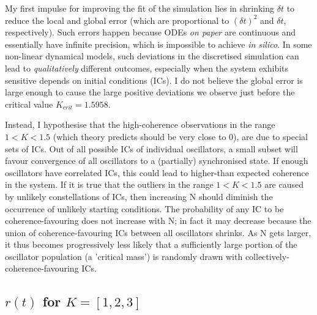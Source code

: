 \documentclass[11pt,a4paper]{article}
\begin{document}
My first impulse for improving the fit of the simulation lies in shrinking $\delta t$ to reduce the local and global error (which are proportional to $(\delta t)^2$ and $\delta t$, respectively).
Such errors happen because ODEs \textit{on paper} are continuous and essentially have infinite precision, which is impossible to achieve \textit{in silico}. 
In some non-linear dynamical models, such deviations in the discretised simulation can lead to \textit{qualitatively} different outcomes, especially when the system exhibits sensitive depends on initial conditions (ICs).
I do not believe the global error is large enough to cause the large positive deviations we observe just before the critical value $K_{crit} = 1.5958$. 

Instead, I hypothesise that the high-coherence observations in the range $1<K<1.5$ (which theory predicts should be very close to 0), are due to special sets of ICs. 
Out of all possible ICs of individual oscillators, a small subset will favour convergence of all oscillators to a (partially) synchronised state. 
If enough oscillators have correlated ICs, this could lead to higher-than expected coherence in the system.
If it is true that the outliers in the range $1<K<1.5$ are caused by unlikely constellations of ICs, then increasing N should diminish the occurrence of unlikely starting conditions. 
The probability of any IC to be coherence-favouring does not increase with N; in fact it may decrease because the union of coherence-favouring ICs between all oscillators shrinks.
As N gets larger, it thus becomes progressively less likely that a sufficiently large portion of the oscillator population (a 'critical mass') is randomly drawn with collectively-coherence-favouring ICs.







\clearpage
\subsection{$r(t)$ for $K = [1, 2,3]$} \label{r(t)}
\end{document}
